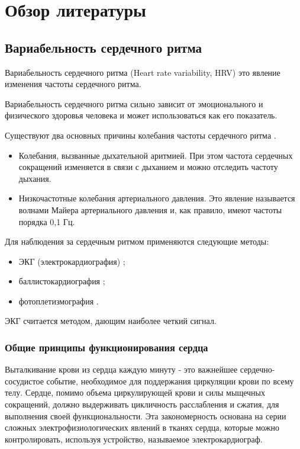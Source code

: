 \chapter{Обзор литературы}
\section{Вариабельность сердечного ритма }

Вариабельность сердечного ритма (Heart rate variability, HRV) это явление изменения частоты сердечного ритма.

Вариабельность сердечного ритма сильно зависит от эмоционального \cite{hrv_and_sensitivity, hrv_and_respiratory} и физического \cite{hrv_and_phisical_health} здоровья человека и может использоваться как его показатель.

Существуют два основных причины колебания частоты сердечного ритма \cite{two_rates_hrv}.

\begin{itemize}
	\item Колебания, вызванные дыхательной аритмией. При этом частота сердечных сокращений изменяется в связи с дыханием и можно отследить частоту дыхания.
	\item Низкочастотные колебания артериального давления. Это явление называется волнами Майера \cite{mayer_wave} артериального давления и, как правило, имеют частоты порядка 0,1 Гц.
\end{itemize}

Для наблюдения за сердечным ритмом применяются следующие методы:

\begin{itemize}
	\item ЭКГ (электрокардиография) \cite{EKG};
	\item баллистокардиография  \cite{Ballistocardiograms};
	\item фотоплетизмография \cite{Photoplethysmography}.
\end{itemize}

ЭКГ считается методом, дающим наиболее четкий сигнал.


\subsection{Общие принципы функционирования сердца}

Выталкивание крови из сердца каждую минуту - это важнейшее сердечно-сосудистое событие, необходимое для поддержания циркуляции крови по всему телу. Сердце, помимо объема циркулирующей крови и силы мыщечных сокращений, должно выдерживать цикличность расслабления и сжатия, для выполнения своей функциональности. Эта закономерность основана на серии сложных электрофизиологических явлений в тканях сердца, которые можно контролировать, используя устройство, называемое электрокардиограф.
 
